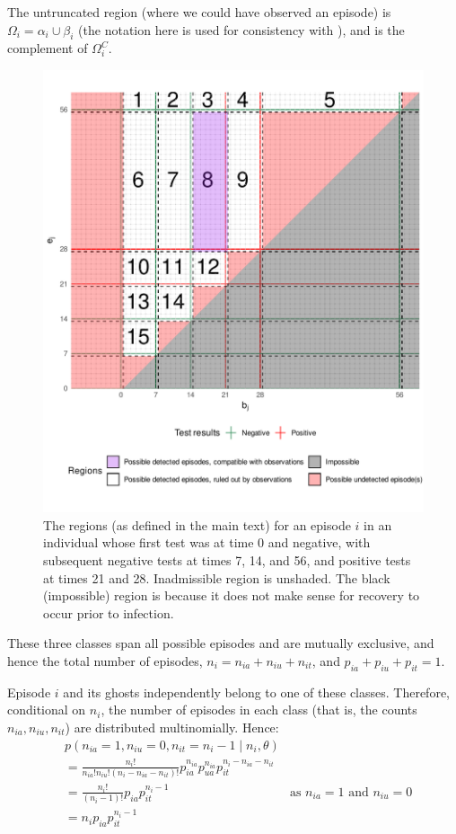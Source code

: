 \documentclass[thesis.tex]{subfiles}
\begin{document}
The untruncated region (where we could have observed an episode) is
$\Omega_i = \alpha_i \cup \beta_i$ (the notation here is used for
consistency with \textcite{heiseyModelling}), and is the
complement of $\Omega^C_i$.

\begin{figure}
\includegraphics[width=\textwidth]{cis-perfect-testing/regions_diag}
\caption[Admissible, inadmissible, and untruncated infections]{The regions (as defined in the main text) for an episode $i$ in an
individual whose first test was at time 0 and negative, with subsequent
negative tests at times 7, 14, and 56, and positive tests at times 21
and 28. Inadmissible region is unshaded. The black (impossible) region is because it does not make sense for recovery to occur prior to infection. \label{perf-test:fig:partitionSpace}}
\end{figure}

These three classes span all possible episodes and are mutually
exclusive, and hence the total number of episodes,
$n_i = n_{ia} + n_{iu} + n_{it}$, and
$p_{ia} + p_{iu} + p_{it} = 1$.

Episode $i$ and its ghosts independently belong to one of these
classes. Therefore, conditional on $n_i$, the number of episodes in
each class (that is, the counts $n_{ia}, n_{iu}, n_{it}$) are
distributed multinomially. Hence:
\begin{align}
&p(n_{ia} = 1, n_{iu} = 0, n_{it} = n_i - 1 \mid n_i, \theta) \\
&= \frac{n_i!}{n_{ia}! n_{iu}! (n_i- n_{ia} - n_{it})!} p_{ia}^{n_{ia}} p_{ua}^{n_{ia}} p_{it}^{n_i- n_{ia} - n_{it}} \\
&= \frac{n_i!}{(n_i-1)!} p_{ia} p_{it}^{n_i- 1} &\text{as $n_{ia} = 1$ and $n_{iu} = 0$}\\
&= n_i p_{ia} p_{it}^{n_i- 1}
\end{align}
\end{document}
